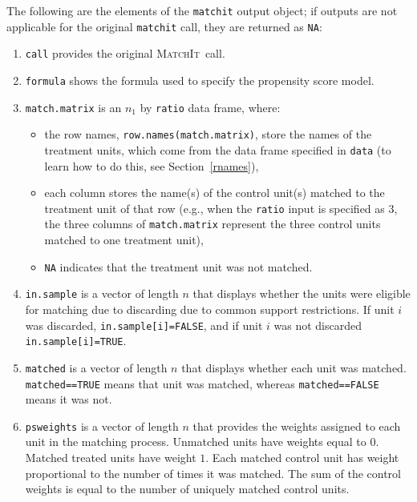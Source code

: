 \documentclass[oneside,letterpaper,titlepage]{article}
\newcommand{\MatchIt}{\textsc{MatchIt}}
\begin{document}
The following are the elements of the \texttt{matchit} output object;
if outputs are not applicable for the original \texttt{matchit} call,
they are returned as \texttt{NA}:

\begin{enumerate}
  
\item \texttt{call} provides the original \MatchIt\ call.
 
\item \texttt{formula} shows the formula used to specify the
  propensity score model.
  
\item \texttt{match.matrix} is an $n_1$ by \texttt{ratio} data frame,
  where:
  \begin{itemize}
  \item the row names, \texttt{row.names(match.matrix)}, store the
    names of the treatment units, which come from the data frame
    specified in \texttt{data} (to learn how to do this, see
    Section~\ref{rnames}),
  \item each column stores the name(s) of the control unit(s) matched
    to the treatment unit of that row (e.g., when the \texttt{ratio}
    input is specified as 3, the three columns of
    \texttt{match.matrix} represent the three control units matched to
    one treatment unit),
   \item \texttt{NA} indicates that the treatment unit was not
     matched.  
   \end{itemize}
   
 \item \texttt{in.sample} is a vector of length $n$ that displays
   whether the units were eligible for matching due to discarding due
   to common support restrictions.  If unit $i$ was discarded,
   \texttt{in.sample[i]=FALSE}, and if unit $i$ was not discarded
   \texttt{in.sample[i]=TRUE}.
   
 \item \texttt{matched} is a vector of length $n$ that displays
   whether each unit was matched.  \texttt{matched==TRUE} means that
   unit was matched, whereas \texttt{matched==FALSE} means it was not.
   
 \item \texttt{psweights} is a vector of length $n$ that provides the
   weights assigned to each unit in the matching process.  Unmatched
   units have weights equal to $0$. Matched treated units have weight
   $1$.  Each matched control unit has weight proportional to the
   number of times it was matched.  The sum of the control weights is
   equal to the number of uniquely matched control units.
   

\end{enumerate}
\end{document}
